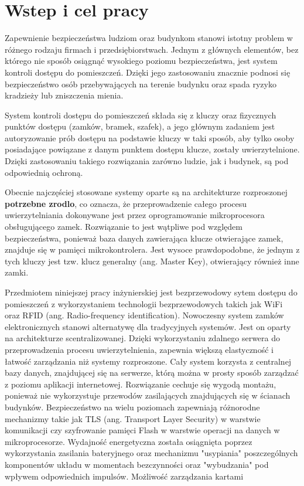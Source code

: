 \chapter{Wstep i cel pracy}


Zapewnienie bezpieczeństwa ludziom oraz budynkom stanowi istotny problem w różnego rodzaju firmach i przedsiębiorstwach. Jednym z głównych elementów, bez którego nie sposób osiągnąć wysokiego poziomu bezpieczeństwa, jest system kontroli dostępu do pomieszczeń. Dzięki jego zastosowaniu znacznie podnosi się bezpieczeństwo osób przebywających na terenie budynku oraz spada ryzyko kradzieży lub zniszczenia mienia.

System kontroli dostępu do pomieszczeń składa się z kluczy oraz fizycznych punktów dostępu (zamków, bramek, szafek), a jego głównym zadaniem jest autoryzowanie prób dostępu na podstawie kluczy w taki sposób, aby tylko osoby posiadające powiązane z danym punktem dostępu klucze, zostały uwierzytelnione. Dzięki zastosowaniu takiego rozwiązania zarówno ludzie, jak i budynek, są pod odpowiednią ochroną.

Obecnie najczęściej stosowane systemy oparte są na architekturze rozproszonej \textbf{potrzebne zrodlo}, co oznacza, że przeprowadzenie całego procesu uwierzytelniania dokonywane jest przez oprogramowanie mikroprocesora obsługującego zamek. Rozwiązanie to jest wątpliwe pod względem bezpieczeństwa, ponieważ baza danych zawierająca klucze otwierające zamek, znajduje się w pamięci mikrokontrolera. Jest wysoce prawdopodobne, że jednym z tych kluczy jest tzw. klucz generalny (ang. Master Key), otwierający również inne zamki.

Przedmiotem niniejszej pracy inżynierskiej jest bezprzewodowy sytem dostępu do pomieszczeń z wykorzystaniem technologii bezprzewodowych takich jak WiFi oraz RFID (ang. Radio-frequency identification).
Nowoczesny system zamków elektronicznych stanowi alternatywę dla tradycyjnych systemów. Jest on oparty na architekturze scentralizowanej. Dzięki wykorzystaniu zdalnego serwera do przeprowadzenia procesu uwierzytelnienia, zapewnia większą elastyczność i łatwość zarządzania niż systemy rozproszone. Cały system korzysta z centralnej bazy danych, znajdującej się na serwerze, którą można w prosty sposób zarządzać z poziomu aplikacji internetowej.
Rozwiązanie cechuje się wygodą montażu, ponieważ nie wykorzystuje przewodów zasilających znajdujących się w ścianach budynków.
Bezpieczeństwo na wielu poziomach zapewniają różnorodne mechanizmy takie jak TLS (ang. Transport Layer Security) w warstwie komunikacji czy szyfrowanie pamięci Flash w warstwie operacji na danych w mikroprocesorze. Wydajność energetyczna została osiągnięta poprzez wykorzystania zasilania bateryjnego oraz mechanizmu "usypiania" poszczególnych komponentów układu w momentach bezczynności oraz "wybudzania" pod wpływem odpowiednich impulsów. Możliwość zarządzania kartami